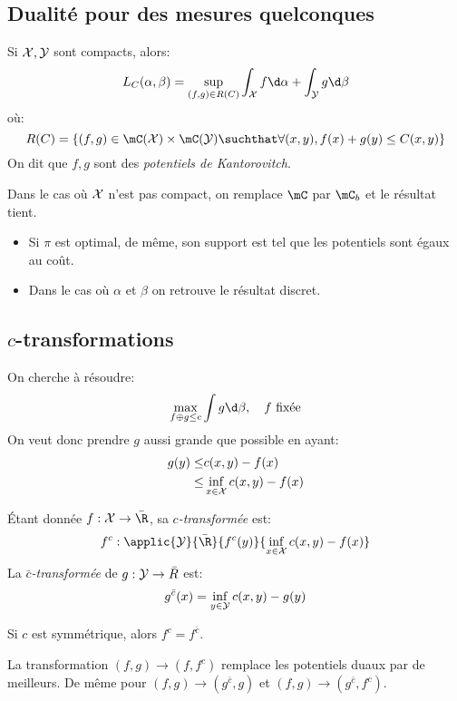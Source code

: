 \subsection{Dualité pour des mesures quelconques}
\begin{proposition}
	Si $\mathcal{X}, \mathcal{Y}$ sont compacts, alors:
	\begin{equation*}
		L_{C}(\alpha, \beta) = \sup_{(f, g) \in R(C)} \int_{\X}f\d \alpha + \int_{\Y}g\d\beta
	\end{equation*}
	où:
	\begin{equation*}
		R(C) = \left\{(f, g) \in \mC(\X) \times \mC(\Y)\suchthat \forall (x, y), f(x) + g(y) \leq C(x, y)\right\}
	\end{equation*}
	On dit que $f, g$ sont des \emph{potentiels de Kantorovitch}.
\end{proposition}
Dans le cas où $\mathcal{X}$ n'est pas compact, on remplace $\mC$ par $\mC_{b}$ et le résultat tient.
\begin{remarque}
	\begin{itemize}
		\item Si $\pi$ est optimal, de même, son support est tel que les potentiels sont égaux au coût.
		\item Dans le cas où $\alpha$ et $\beta$ on retrouve le résultat discret.
	\end{itemize}
\end{remarque}

\subsection{$c$-transformations}
On cherche à résoudre:
\begin{equation*}
	\max_{f \oplus g\leq c} \int g\d\beta, \quad f \text{ fixée}
\end{equation*}
On veut donc prendre $g$ aussi grande que possible en ayant:
\begin{align*}
	g(y) \leq & c(x, y) - f(x)                \\
	\leq      & \inf_{x\in \mathcal{X}} c(x, y) - f(x)
\end{align*}

\begin{definition}
	Étant donnée $f: \X \to \bar{\R}$, sa \emph{$c$-transformée} est:
	\begin{equation*}
		f^{c}: \applic{\Y}{\bar{\R}}{f^{c}(y)}{\inf_{x\in \X} c(x, y) - f(x)}
	\end{equation*}
	La \emph{$\bar{c}$-transformée} de $g: \mathcal{Y}\to \bar{R}$ est:
	\begin{equation*}
		g^{\bar{c}}(x) = \inf_{y\in \mathcal{Y}} c(x, y) - g(y)
	\end{equation*}
\end{definition}
Si $c$ est symmétrique, alors $f^{c} = f^{\bar{c}}$.
\begin{remarque}
	La transformation $(f, g) \to (f, f^{c})$ remplace les potentiels duaux par de meilleurs.
	De même pour $(f, g) \to (g^{\bar{c}}, g)$ et $(f, g) \to (g^{\bar{c}}, f^{c})$.
\end{remarque}

